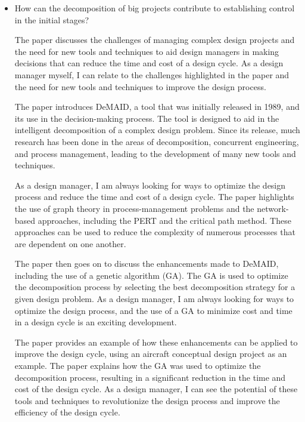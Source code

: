 \documentclass[runningheads]{llncs}
\begin{document}
\begin{itemize}
  \item How can the decomposition of big projects contribute to establishing control in the initial stages?

The paper discusses the challenges of managing complex design projects and the need for new tools and techniques to aid design managers in making decisions that can reduce the time and cost of a design cycle. As a design manager myself, I can relate to the challenges highlighted in the paper and the need for new tools and techniques to improve the design process.

The paper introduces DeMAID, a tool that was initially released in 1989, and its use in the decision-making process. The tool is designed to aid in the intelligent decomposition of a complex design problem. Since its release, much research has been done in the areas of decomposition, concurrent engineering, and process management, leading to the development of many new tools and techniques.

As a design manager, I am always looking for ways to optimize the design process and reduce the time and cost of a design cycle. The paper highlights the use of graph theory in process-management problems and the network-based approaches, including the PERT and the critical path method. These approaches can be used to reduce the complexity of numerous processes that are dependent on one another.

The paper then goes on to discuss the enhancements made to DeMAID, including the use of a genetic algorithm (GA). The GA is used to optimize the decomposition process by selecting the best decomposition strategy for a given design problem. As a design manager, I am always looking for ways to optimize the design process, and the use of a GA to minimize cost and time in a design cycle is an exciting development.

The paper provides an example of how these enhancements can be applied to improve the design cycle, using an aircraft conceptual design project as an example. The paper explains how the GA was used to optimize the decomposition process, resulting in a significant reduction in the time and cost of the design cycle. As a design manager, I can see the potential of these tools and techniques to revolutionize the design process and improve the efficiency of the design cycle.


\end{itemize}
\end{document}
